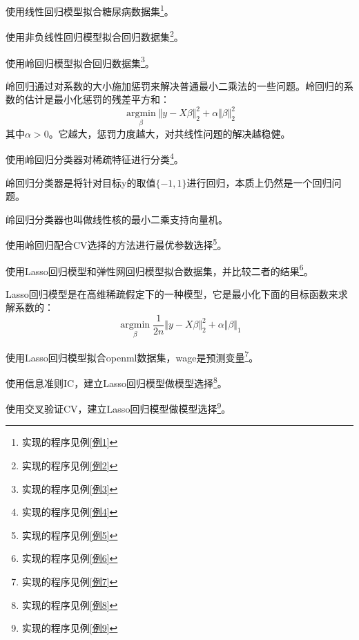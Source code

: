 \begin{Example}
	使用线性回归模型拟合糖尿病数据集\footnote{实现的程序见例\ref{例1}}。
\end{Example}

\begin{Example}
	使用非负线性回归模型拟合回归数据集\footnote{实现的程序见例\ref{例2}}。
\end{Example}

\begin{Example}
	使用岭回归模型拟合回归数据集\footnote{实现的程序见例\ref{例3}}。
	
	岭回归通过对系数的大小施加惩罚来解决普通最小二乘法的一些问题。岭回归的系数的估计是最小化惩罚的残差平方和：
	\[
	\mathop{\arg\min}\limits_{\beta}\Vert y-X\beta\Vert^2_2+\alpha \Vert\beta\Vert^2_2
	\]
	其中$\alpha>0$。它越大，惩罚力度越大，对共线性问题的解决越稳健。
\end{Example}

\begin{Example}
	使用岭回归分类器对稀疏特征进行分类\footnote{实现的程序见例\ref{例4}}。
	
	岭回归分类器是将针对目标y的取值$\{-1,1\}$进行回归，本质上仍然是一个回归问题。

	岭回归分类器也叫做线性核的最小二乘支持向量机。
\end{Example}

\begin{Example}
	使用岭回归配合CV选择的方法进行最优参数选择\footnote{实现的程序见例\ref{例5}}。
\end{Example}

\begin{Example}
	使用Lasso回归模型和弹性网回归模型拟合数据集，并比较二者的结果\footnote{实现的程序见例\ref{例6}}。

	Lasso回归模型是在高维稀疏假定下的一种模型，它是最小化下面的目标函数来求解系数的：
	\[
		\mathop{\arg\min}\limits_{\beta}\dfrac{1}{2n}\Vert y-X\beta\Vert^2_2+\alpha \Vert\beta\Vert_1
	\]
\end{Example}

\begin{Example}
	使用Lasso回归模型拟合openml数据集，wage是预测变量\footnote{实现的程序见例\ref{例7}}。
\end{Example}

\begin{Example}
	使用信息准则IC，建立Lasso回归模型做模型选择\footnote{实现的程序见例\ref{例8}}。
\end{Example}

\begin{Example}
	使用交叉验证CV，建立Lasso回归模型做模型选择\footnote{实现的程序见例\ref{例9}}。
\end{Example}

